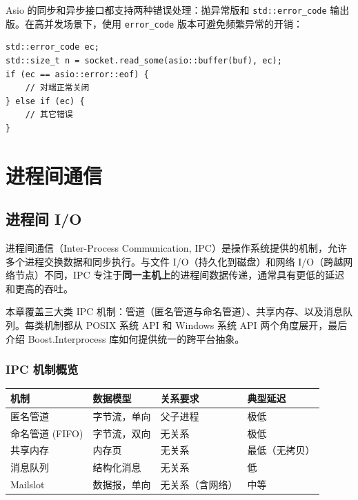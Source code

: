\documentclass[12pt,a4paper,fontset=fandol]{ctexbook}
\newcommand{\Tp}[1]{\texttt{#1}}
\begin{document}
\begin{bestpractice}[title=Asio 中的错误处理]
Asio 的同步和异步接口都支持两种错误处理：抛异常版和 \Tp{std::error\_code} 输出版。在高并发场景下，使用 \Tp{error\_code} 版本可避免频繁异常的开销：

\begin{lstlisting}
std::error_code ec;
std::size_t n = socket.read_some(asio::buffer(buf), ec);
if (ec == asio::error::eof) {
    // 对端正常关闭
} else if (ec) {
    // 其它错误
}
\end{lstlisting}
\end{bestpractice}

\part{进程间通信}

\chapter{进程间 I/O}

进程间通信（Inter-Process Communication, IPC）是操作系统提供的机制，允许多个进程交换数据和同步执行。与文件 I/O（持久化到磁盘）和网络 I/O（跨越网络节点）不同，IPC 专注于\textbf{同一主机上}的进程间数据传递，通常具有更低的延迟和更高的吞吐。

本章覆盖三大类 IPC 机制：管道（匿名管道与命名管道）、共享内存、以及消息队列。每类机制都从 POSIX 系统 API 和 Windows 系统 API 两个角度展开，最后介绍 Boost.Interprocess 库如何提供统一的跨平台抽象。

\section{IPC 机制概览}

\begin{compare}[title=IPC 机制选型]
\begin{tabularx}{\textwidth}{l>{\raggedright\arraybackslash}X>{\raggedright\arraybackslash}X>{\raggedright\arraybackslash}X}
\toprule
\textbf{机制} & \textbf{数据模型} & \textbf{关系要求} & \textbf{典型延迟} \\
\midrule
匿名管道 & 字节流，单向 & 父子进程 & 极低 \\
命名管道 (FIFO) & 字节流，双向 & 无关系 & 极低 \\
共享内存 & 内存页 & 无关系 & 最低（无拷贝） \\
消息队列 & 结构化消息 & 无关系 & 低 \\
Mailslot & 数据报，单向 & 无关系（含网络） & 中等 \\
\bottomrule
\end{tabularx}
\end{compare}
\end{document}
